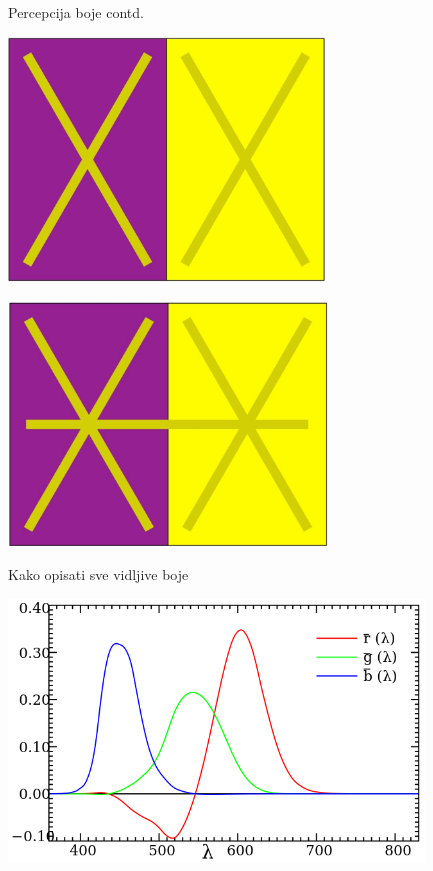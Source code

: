 \documentclass[9pt]{beamer}
\begin{document}
\begin{frame}{Percepcija boje contd.}
	\only<1> {
		\begin{center}
			\includegraphics[height=6.5cm]{slike/color_slide_119_cropped.jpg}
		\end{center}
	}
	 {
		\begin{center}
			\includegraphics[height=6.5cm]{slike/color_slide_120_cropped.jpg}
		\end{center}
	}	
\end{frame}


\begin{frame}{Kako opisati sve vidljive boje}
	\begin{center}
		\includegraphics[height=7cm]{slike/rgb_mathcing_fun.png}
	\end{center}
\end{frame}
\end{document}
